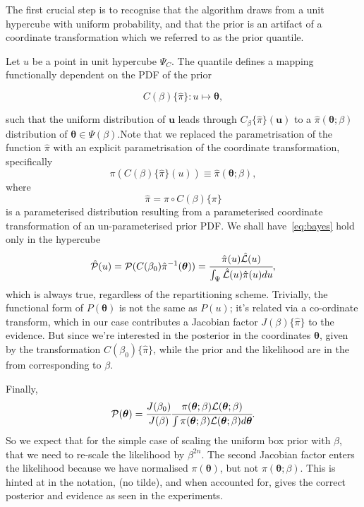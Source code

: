 \documentclass[usenatbib]{mnras}
\begin{document}
The first crucial step is to recognise that the algorithm draws
from a unit hypercube with uniform probability, and that the prior
is an artifact of a coordinate transformation which we referred to
as the prior quantile.

Let \(u\) be a point in unit hypercube \(\Psi_{C}\). The quantile
defines a mapping functionally dependent on the PDF of the prior

\begin{equation}
  C(\beta)\lbrace \hat{\pi}\rbrace:u \mapsto \bm{\theta},\label{eq:coordinate-transform}
\end{equation}

such that
the uniform distribution of \(\bm{u}\) leads through
\(C_{\beta}\{\hat{\pi}\}(\bm{u})\) to a \(\hat{\pi}(\bm{\theta};\beta)\)
distribution of \(\bm{\theta} \in\Psi(\beta)\).Note that we replaced the
parametrisation of the function \(\hat{\pi}\) with an explicit
parametrisation of the coordinate transformation, specifically
\begin{equation}
  \pi(C(\beta)\{\hat{\pi}\}(u)) \equiv \hat{\pi}(\bm{\theta}; \beta),
\end{equation}
where 
\begin{equation}
  \hat{\pi} =  \pi \circ C(\beta) \{ \pi \} 
\end{equation}
is a parameterised distribution resulting from a parameterised
coordinate transformation of an un-parameterised prior PDF. We shall
have~\vref{eq:bayes} hold only in the hypercube
\begin{equation}
{\cal \hat{P}}(u) = {\cal P}(C(\beta_{0}){\hat{\pi}}^{-1}(\bm{\theta})) = \cfrac{\hat{\pi} (u) {\cal \hat{L}}(u)}{\int_{\Psi}{\cal \hat{L}}(u) \hat{\pi}(u) du},
\end{equation}
which is always true, regardless of the repartitioning
scheme. Trivially, the functional form of \(P(\bm{\theta})\) is not the same
as \(P(u)\); it's related via a co-ordinate transform, which in our
case contributes a Jacobian factor \(J(\beta)\{\hat{\pi}\}\) to the
evidence. But since we're interested in the posterior in the
coordinates \(\bm{\theta}\), given by the transformation \(C(\beta_{0})\{\hat{\pi}\}\),
while the prior and the likelihood are in the from corresponding
to \(\beta\).

Finally, 
\begin{equation}
 {\cal P}(\bm{\theta}) = \cfrac{J(\beta_{0})}{J(\beta)} \cfrac{\pi(\bm{\theta}; \beta) {\cal L}(\bm{\theta}; \beta)}{\int \pi(\bm{\theta}; \beta) {\cal L}(\bm{\theta}; \beta) d \bm{\theta}}.
\end{equation}
So we expect that for the simple case of scaling the uniform box
prior with \(\beta\), that we need to re-scale the likelihood by
\(\beta^{2n}\). The second Jacobian factor enters the likelihood because
we have normalised \(\pi(\bm{\theta})\), but not \(\pi(\bm{\theta}; \beta)\). This is hinted at in
the notation, (no tilde), and when accounted for, gives  the correct
posterior and evidence as seen in the experiments.
\end{document}
